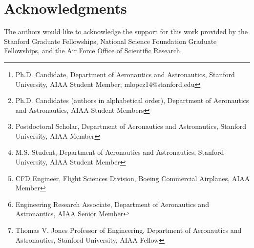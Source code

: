 \documentclass{aiaa-tc}
\author{Manuel R. L\'opez-Morales
         \thanks{Ph.D. Candidate, Department of Aeronautics and Astronautics, Stanford University, AIAA Student Member; mlopez14@stanford.edu}, 
            Abhishek Sheshadri,\thanks{Ph.D. Candidates (authors in alphabetical order), Department of Aeronautics and Astronautics, AIAA Student Members},\\
            Kartikey Asthana\footnotemark[2],
            Jonathan Bull\thanks{Postdoctoral Scholar, Department of Aeronautics and Astronautics, Stanford University, AIAA Member},
            Jacob Crabill\thanks{M.S. Student, Department of Aeronautics and Astronautics, Stanford University, AIAA Student Member},
            Thomas Economon\footnotemark[2],
            David Manosalvas\footnotemark[2],\\
            Joshua Romero\footnotemark[2],
            Jerry Watkins\footnotemark[2],
            David Williams\thanks{CFD Engineer, Flight Sciences Division, Boeing Commercial Airplanes, AIAA Member},\\
            Francisco Palacios\thanks{Engineering Research Associate, Department of Aeronautics and Astronautics, AIAA Senior Member}, and
            Antony Jameson\thanks{Thomas V. Jones Professor of Engineering, Department of Aeronautics and Astronautics, Stanford University, AIAA Fellow} \\
           \normalsize\itshape
         Department of Aeronautics and Astronautics, Stanford University, Stanford, CA, 94305 \vspace{0.1in}
         }
\begin{document}
\vspace{2in}
\maketitle


\vspace{.20in}

% 


\vspace{.20in}


\vspace{.20in}


\vspace{.20in}


\vspace{.20in}


\vspace{.20in}

%


\section*{Acknowledgments}

The authors would like to acknowledge the support for this work provided by the Stanford Graduate Fellowships, National Science Foundation Graduate Fellowships, and the Air Force Office of Scientific Research.







 
\end{document}

